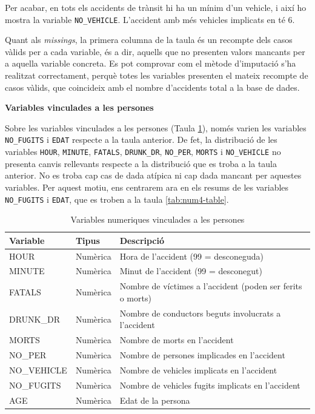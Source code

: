 \documentclass[12pt,longbibliography]{article}
\theoremstyle{definition}
\theoremstyle{remark}
\begin{document}
Per acabar, en tots els accidents de trànsit hi ha un mínim d'un vehicle, i així ho mostra la variable \texttt{NO\_VEHICLE}. L'accident amb més vehicles implicats en té 6.


Quant als \emph{missings}, la primera columna de la taula és un recompte dels casos vàlids per a cada variable, és a dir, aquells que no presenten valors mancants per a aquella variable concreta. Es pot comprovar com el mètode d'imputació s'ha realitzat correctament, perquè totes les variables presenten el mateix recompte de casos vàlids, que coincideix amb el nombre d'accidents total a la base de dades.

\textbf{Variables vinculades a les persones}

Sobre les variables vinculades a les persones (Taula \ref{tab:num3-table}), només varien les variables \texttt{NO\_FUGITS} i \texttt{EDAT} respecte a la taula anterior. De fet, la distribució de les variables \texttt{HOUR}, \texttt{MINUTE}, \texttt{FATALS}, \texttt{DRUNK\_DR}, \texttt{NO\_PER}, \texttt{MORTS} i \texttt{NO\_VEHICLE} no presenta canvis rellevants respecte a la distribució que es troba a la taula anterior. No es troba cap cas de dada atípica ni cap dada mancant per aquestes variables. Per aquest motiu, ens centrarem ara en els resums de les variables \texttt{NO\_FUGITS} i \texttt{EDAT}, que es troben a la taula \ref{tab:num4-table}.

\begin{table}[H]
\centering
\begin{tabular}{lll}
\hline
Variable    & Tipus    & Descripció                                           \\ \hline
HOUR        & Numèrica & Hora de l’accident (99 = desconeguda)                \\
MINUTE      & Numèrica & Minut de l’accident (99 = desconegut)                \\
FATALS      & Numèrica & Nombre de víctimes a l’accident  (poden ser ferits o morts)                     \\
DRUNK\_DR   & Numèrica & Nombre de conductors beguts involucrats a l’accident \\
MORTS       & Numèrica & Nombre de morts en l’accident                        \\
NO\_PER     & Numèrica & Nombre de persones implicades en l’accident          \\
NO\_VEHICLE & Numèrica & Nombre de vehicles implicats en l’accident           \\
NO\_FUGITS  & Numèrica & Nombre de vehicles fugits implicats en l’accident    \\
AGE         & Numèrica & Edat de la persona                                   \\ \hline
\end{tabular}
\caption{Variables numeriques vinculades a les persones}
\label{tab:num3-table}
\end{table}
\end{document}
